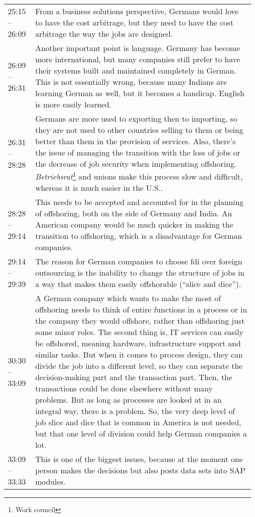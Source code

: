 \begin{appendix}
\begin{longtable}{l p{12.5cm}}
	25:15 -- 26:09&From a business solutions perspective, Germans would love to have the cost arbitrage, but they need to have the cost arbitrage the way the jobs are designed.\\
	26:09 -- 26:31&Another important point is language. Germany has become more international, but many companies still prefer to have their systems built and maintained completely in German. This is not essentially wrong, because many Indians are learning German as well, but it becomes a handicap. English is more easily learned.\\
	26:31 -- 28:28& Germans are more used to exporting then to importing, so they are not used to other countries selling to them or being better than them in the provision of services. Also, there's the issue of managing the transition with the loss of jobs or the decrease of job security when implementing offshoring. \textit{Betriebsrat}\footnote{Work council} and unions make this process slow and difficult, whereas it is much easier in the U.S.. \\
	28:28 -- 29:14&This needs to be accepted and accounted for in the planning of offshoring, both on the side of Germany and India. An American company would be much quicker in making the transition to offshoring, which is a disadvantage for German companies.\\
	29:14 -- 29:39&The reason for German companies to choose \gls{fdi} over foreign outsourcing is the inability to change the structure of jobs in a way that makes them easily offshorable (``slice and dice'').\\
	30:30 -- 33:09& A German company which wants to make the most of offshoring needs to think of entire functions in a process or in the company they would offshore, rather than offshoring just some minor roles. The second thing is, IT services can easily be offshored, meaning hardware, infrastructure support and similar tasks. But when it comes to process design, they can divide the job into a different level, so they can separate the decision-making part and the transaction part. Then, the transactions could be done elsewhere without many problems. But as long as processes are looked at in an integral way, there is a problem. So, the very deep level of job slice and dice that is common in America is not needed, but that one level of division could help German companies a lot.\\
	33:09 -- 33:33& This is one of the biggest issues, because at the moment one person makes the decisions but also posts data sets into SAP modules.\\

\end{longtable}
\end{appendix}
